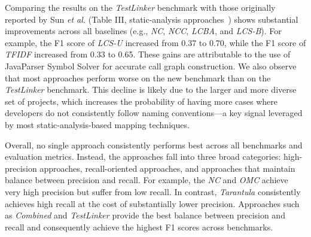 Comparing the results on the \emph{TestLinker} benchmark with those originally reported by Sun \textit{et al.} (Table III, static-analysis approaches~\cite{sun_method-level_2024}) shows substantial improvements across all baselines (e.g., \emph{NC}, \emph{NCC}, \emph{LCBA}, and \emph{LCS-B}). For example, the F1 score of \emph{LCS-U} increased from 0.37 to 0.70, while the F1 score of \emph{TFIDF} increased from 0.33 to 0.65.
These gains are attributable to the use of JavaParser Symbol Solver for accurate call graph construction.
We also observe that most approaches perform worse on the new benchmark than on the \emph{TestLinker} benchmark. This decline is likely due to the larger and more diverse set of projects, which increases the probability of having more cases where developers do not consistently follow naming conventions—a key signal leveraged by most static-analysis-based mapping techniques.

Overall, no single approach consistently performs best across all benchmarks and evaluation metrics. Instead, the approaches fall into three broad categories: high-precision approaches, recall-oriented approaches, and approaches that maintain balance between precision and recall. For example, the \emph{NC} and \emph{OMC} achieve very high precision but suffer from low recall. In contrast, \emph{Tarantula} consistently achieves high recall at the cost of substantially lower precision. Approaches such as \emph{Combined} and \emph{TestLinker} provide the best balance between precision and recall and consequently achieve the highest F1 scores across benchmarks.

